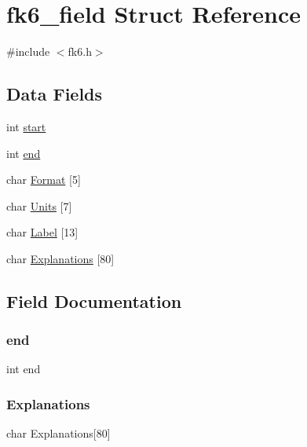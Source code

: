 \hypertarget{structfk6__field}{}\section{fk6\+\_\+field Struct Reference}
\label{structfk6__field}


{\ttfamily \#include $<$fk6.\+h$>$}

\subsection*{Data Fields}
\begin{DoxyCompactItemize}
\item 
int \mbox{\hyperlink{structfk6__field_a37722a150250e2a5a98e5e0d11e53449}{start}}
\item 
int \mbox{\hyperlink{structfk6__field_abce9f5dc9c83f2639b72024fdee5d388}{end}}
\item 
char \mbox{\hyperlink{structfk6__field_aaca41c3398ccc1173d7f8a18327977e2}{Format}} \mbox{[}5\mbox{]}
\item 
char \mbox{\hyperlink{structfk6__field_a0d5858a3e50c210b03037826dacca502}{Units}} \mbox{[}7\mbox{]}
\item 
char \mbox{\hyperlink{structfk6__field_a0be762a3d71ca116f4f508322fe2070e}{Label}} \mbox{[}13\mbox{]}
\item 
char \mbox{\hyperlink{structfk6__field_a60e7dc728f6ab7f3caa6ec9ba6b7be75}{Explanations}} \mbox{[}80\mbox{]}
\end{DoxyCompactItemize}


\subsection{Field Documentation}
\mbox{\label{structfk6__field_abce9f5dc9c83f2639b72024fdee5d388}} 
\subsubsection{\texorpdfstring{end}{end}}
{\footnotesize\ttfamily int end}

\mbox{\label{structfk6__field_a60e7dc728f6ab7f3caa6ec9ba6b7be75}} 
\subsubsection{\texorpdfstring{Explanations}{Explanations}}
{\footnotesize\ttfamily char Explanations\mbox{[}80\mbox{]}}

